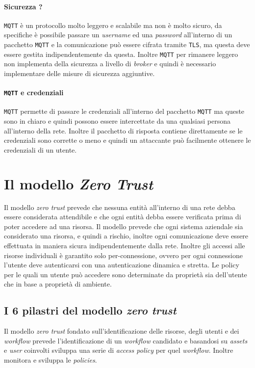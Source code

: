         \paragraph{Sicurezza ?} \texttt{MQTT} è un protocollo molto leggero e scalabile ma non è molto sicuro, da specifiche è possibile passare un \textit{username} ed una \textit{password} all'interno di un pacchetto \texttt{MQTT} e la comunicazione può essere cifrata tramite \texttt{TLS}, ma questa deve essere gestita indipendentemente da questa. Inoltre \texttt{MQTT} per rimanere leggero non implementa della sicurezza a livello di \textit{broker} e quindi è necessario implementare delle misure di sicurezza aggiuntive.
        \paragraph{\texttt{MQTT} e credenziali} \texttt{MQTT} permette di passare le credenziali all'interno del pacchetto \texttt{MQTT} ma queste sono in chiaro e quindi possono essere intercettate da una qualsiasi persona all'interno della rete. Inoltre il pacchetto di risposta contiene direttamente se le credenziali sono corrette o meno e quindi un attaccante può facilmente ottenere le credenziali di un utente.

\section{Il modello \textit{Zero Trust}}
    Il modello \textit{zero trust} prevede che nessuna entità all'interno di una rete debba essere considerata attendibile e che ogni entità debba essere verificata prima di poter accedere ad una risorsa. Il modello prevede che ogni sistema aziendale sia considerato una risorsa, e quindi a rischio, inoltre ogni comunicazione deve essere effettuata in maniera sicura indipendentemente dalla rete. Inoltre gli accessi alle risorse individuali è garantito solo per-connessione, ovvero per ogni connessione l'utente deve autenticarsi con una autenticazione dinamica e stretta. Le policy per le quali un utente può accedere sono determinate da proprietà sia dell'utente che in base a proprietà di ambiente.
    \subsection{I 6 pilastri del modello \textit{zero trust}}
        Il modello \textit{zero trust} fondato sull'identificazione delle risorse, degli utenti e dei \textit{workflow} prevede l'identificazione di un \textit{workflow} candidato e basandosi su \textit{assets} e \textit{user} coinvolti sviluppa una serie di \textit{access policy} per quel \textit{workflow}. Inoltre monitora e sviluppa le \textit{policies}.
